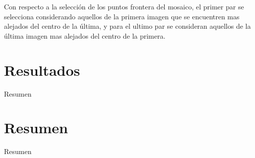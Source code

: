 Con respecto  a la selección de los puntos frontera del mosaico, el primer par se selecciona considerando aquellos de la primera imagen que se encuentren mas alejados del centro de la última, y para el ultimo par se consideran aquellos de la última imagen mas alejados del centro de la primera.

\section{Resultados}
Resumen

\section{Resumen}
Resumen



